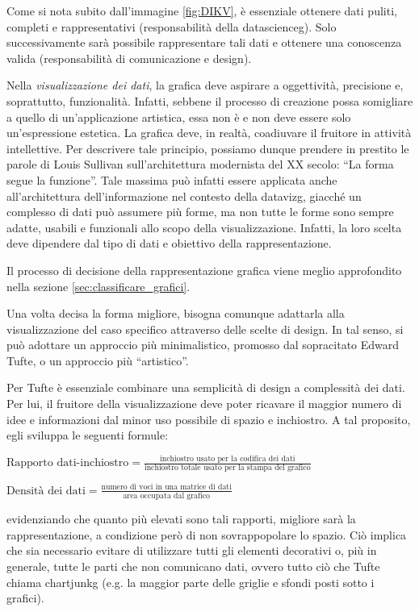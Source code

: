 Come si nota subito dall'immagine \ref{fig:DIKV}, è essenziale ottenere dati puliti, completi e rappresentativi (responsabilità della \gls{datascienceg}). Solo successivamente sarà possibile rappresentare tali dati e 
ottenere una conoscenza valida (responsabilità di comunicazione e design).

\bigskip
\noindent Nella \emph{visualizzazione dei dati}, la grafica deve aspirare a oggettività, precisione e, soprattutto, funzionalità. Infatti, sebbene il processo di creazione possa somigliare 
a quello di un'applicazione artistica, essa non è e non deve essere solo un'espressione estetica. La grafica deve, in realtà, coadiuvare il fruitore in attività intellettive.
Per descrivere tale principio, possiamo dunque prendere in prestito le parole di Louis Sullivan sull'architettura modernista del XX secolo: ``La forma segue la funzione''. 
Tale massima può infatti essere applicata anche all'architettura dell'informazione nel contesto della \gls{datavizg}, giacché
un complesso di dati può assumere più forme, ma non tutte le forme sono sempre adatte, usabili e funzionali allo scopo della visualizzazione. Infatti, la loro scelta deve dipendere dal
tipo di dati e obiettivo della rappresentazione.

Il processo di decisione della rappresentazione grafica viene meglio approfondito nella sezione \ref{sec:classificare_grafici}.

\bigskip
\noindent Una volta decisa la forma migliore, bisogna comunque adattarla alla visualizzazione del caso specifico attraverso delle scelte di design.
In tal senso, si può adottare un approccio più minimalistico, promosso dal sopracitato Edward Tufte, o un approccio più ``artistico''.

Per Tufte è essenziale combinare una semplicità di design a complessità dei dati. Per lui, il fruitore della visualizzazione deve poter ricavare il maggior numero di idee e informazioni dal minor uso possibile di spazio e inchiostro.
A tal proposito, egli sviluppa le seguenti formule: 
\begin{center}
    $\text{Rapporto dati-inchiostro} = \frac{\text{inchiostro usato per la codifica dei dati}}{\text{inchiostro totale usato per la stampa del grafico}}$
\end{center}
\begin{center}
    $\text{Densità dei dati} = \frac{\text{numero di voci in una matrice di dati}}{\text{area occupata dal grafico}}$            %
\end{center}
evidenziando che quanto più elevati sono tali rapporti, migliore sarà la rappresentazione, a condizione però di non sovrappopolare lo spazio.
Ciò implica che sia necessario evitare di utilizzare tutti gli elementi decorativi o, più in generale, tutte le parti che non comunicano
dati, ovvero tutto ciò che Tufte chiama \gls{chartjunkg} (e.g. la maggior parte delle griglie e sfondi posti sotto i grafici).

